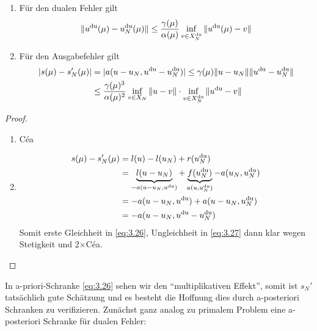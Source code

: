 \begin{satz} \beginwithlist
	\begin{enumerate}
		\item Für den dualen Fehler gilt
			\[
				\|u^{\mathrm{du}}(\mu)-u_N^{\mathrm{du}}(\mu)\| \leq \frac{\gamma(\mu)}{\alpha(\mu)} \inf_{v \in X_N^{\mathrm{du}}} \|u^{\mathrm{du}}(\mu)-v\|
			\]
		\item Für den Ausgabefehler gilt
			\begin{equation} \label{eq:3.26}
				\begin{aligned}
					|s(\mu)-s_N'(\mu)| &= |a(u-u_N,u^{\mathrm{du}}-u_N^{\mathrm{du}})| \leq \gamma(\mu) \|u-u_N\| \|u^{\mathrm{du}}-u_N^{\mathrm{du}}\|\\
					&\leq \frac{\gamma(\mu)^3}{\alpha(\mu)^2} \inf_{v \in X_N} \|u-v\| \cdot \inf_{v \in X_N^{\mathrm{du}}} \|u^{\mathrm{du}}-v\|
				\end{aligned}
			\end{equation}
	\end{enumerate}

	\begin{proof} \beginwithlistbew
		\begin{enumerate}
			\item Céa
			\item
				\begin{equation} \label{eq:3.27}
					\begin{aligned}
						s(\mu) - s_N'(\mu) &= l(u)-l(u_N)+r(u_N^{\mathrm{du}})\\
						&= \underbrace{l(u-u_N)}_{-a(u-u_N,u^{\mathrm{du}})} + \underbrace{f(u_N^{\mathrm{du}})}_{a(u,u_N^{\mathrm{du}})} - a(u_N,u_N^{\mathrm{du}})\\
						&= -a(u-u_N,u^{\mathrm{du}})+a(u-u_N,u_N^{\mathrm{du}})\\
						&= -a(u-u_N,u^{\mathrm{du}}-u_N^{\mathrm{du}})
					\end{aligned}
				\end{equation}
				Somit erste Gleichheit in \eqref{eq:3.26}, Ungleichheit in \eqref{eq:3.27} dann klar wegen Stetigkeit und 2$\times$Céa.
		\end{enumerate}
	\end{proof}
\end{satz}

In a-priori-Schranke \eqref{eq:3.26} sehen wir den ``multiplikativen Effekt'', somit ist $s_N'$ tatsächlich gute Schätzung und es besteht die Hoffnung dies durch a-posteriori Schranken zu verifizieren.
Zunächst ganz analog zu primalem Problem eine a-posteriori Schranke für dualen Fehler:

